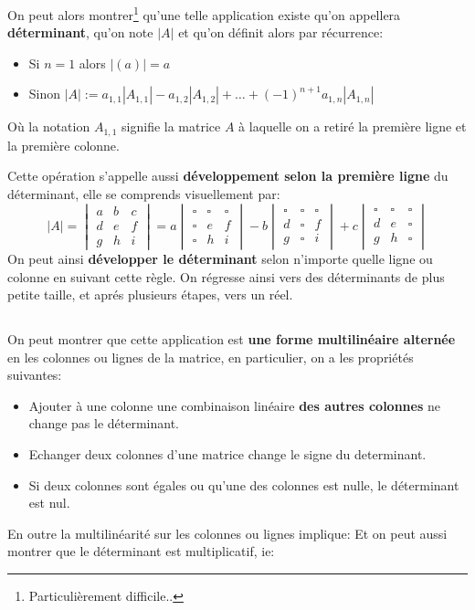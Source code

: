 On peut alors montrer\footnote[1]{Particulièrement difficile..} qu'une telle application existe qu'on appellera \textbf{déterminant}, qu'on note \(|A|\) et qu'on définit alors par récurrence:
\begin{itemize}
   \item Si \(n = 1\) alors \(|(a)| = a \) 
   \item Sinon \(|A| := a_{1, 1}|A_{1, 1}| - a_{1, 2}|A_{1, 2}| + \ldots + (-1)^{n+1}a_{1, n}|A_{1, n}|\)
\end{itemize}
Où la notation \(A_{1, 1}\) signifie la matrice \(A\) à laquelle on a retiré la première ligne et la première colonne. \<

Cette opération s'appelle aussi \textbf{développement selon la première ligne} du déterminant, elle se comprends visuellement par:
\[
   |A| = \begin{vmatrix} a & b & c \\ d & e & f \\ g & h & i \end{vmatrix} = 
   a \begin{vmatrix} \square & \square & \square \\ \square & e & f \\ \square & h & i \end{vmatrix} - 
   b \begin{vmatrix} \square & \square & \square \\ d & \square & f \\ g & \square & i \end{vmatrix} + 
   c \begin{vmatrix} \square & \square & \square \\ d & e & \square \\ g & h & \square \end{vmatrix}   
\]
On peut ainsi \textbf{développer le déterminant} selon n'importe quelle ligne ou colonne en suivant cette règle. On régresse ainsi vers des déterminants de plus petite taille, et aprés plusieurs étapes, vers un réel.

\subsection*{}

On peut montrer que cette application est \textbf{une forme multilinéaire alternée} en les colonnes ou lignes de la matrice, en particulier, on a les propriétés suivantes:
\begin{itemize}
   \item Ajouter à une colonne une combinaison linéaire \textbf{des autres colonnes} ne change pas le déterminant.
   \item Echanger deux colonnes d'une matrice change le signe du determinant.
   \item Si deux colonnes sont égales ou qu'une des colonnes est nulle, le déterminant est nul.
\end{itemize}
En outre la multilinéarité sur les colonnes ou lignes implique:
Et on peut aussi montrer que le déterminant est multiplicatif, ie:

